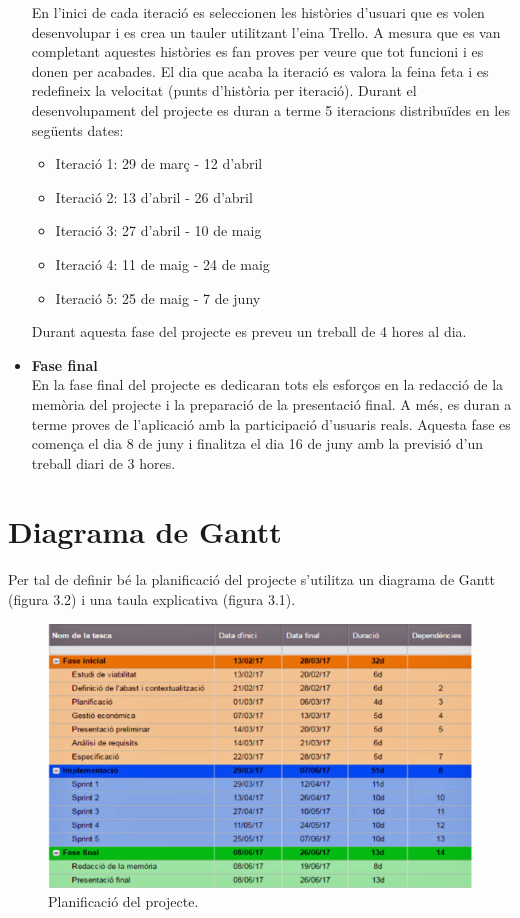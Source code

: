\begin{itemize}
En l'inici de cada iteració es seleccionen les històries d'usuari que es volen desenvolupar i es crea un tauler utilitzant l'eina Trello. A mesura que es van completant aquestes històries es fan proves per veure que tot funcioni i es donen per acabades. El dia que acaba la iteració es valora la feina feta i es redefineix la velocitat (punts d'història per iteració).
Durant el desenvolupament del projecte es duran a terme 5 iteracions distribuïdes en les següents dates:
\begin{itemize}
\item{}Iteració 1: 29 de març - 12 d'abril
\item{}Iteració 2: 13 d'abril - 26 d'abril
\item{}Iteració 3: 27 d'abril - 10 de maig
\item{}Iteració 4: 11 de maig - 24 de maig
\item{}Iteració 5: 25 de maig - 7 de juny
\end{itemize}
Durant aquesta fase del projecte es preveu un treball de 4 hores al dia.
\item{}\textbf{Fase final}\\
En la fase final del projecte es dedicaran tots els esforços en la redacció de
la memòria del projecte i la preparació de la presentació final. A més, es
duran a terme proves de l'aplicació amb la participació d'usuaris reals.
Aquesta fase es comença el dia 8 de juny i finalitza el dia 16 de juny amb
la previsió d'un treball diari de 3 hores.

\end{itemize}

\section{Diagrama de Gantt}

Per tal de definir bé la planificació del projecte s'utilitza un diagrama de Gantt (figura 3.2) i una taula explicativa (figura 3.1).

\begin{figure}[!h]
\centering
\includegraphics[scale=0.65]{Figures/planificacio.jpg}
\caption{Planificació del projecte.}
\end{figure}

